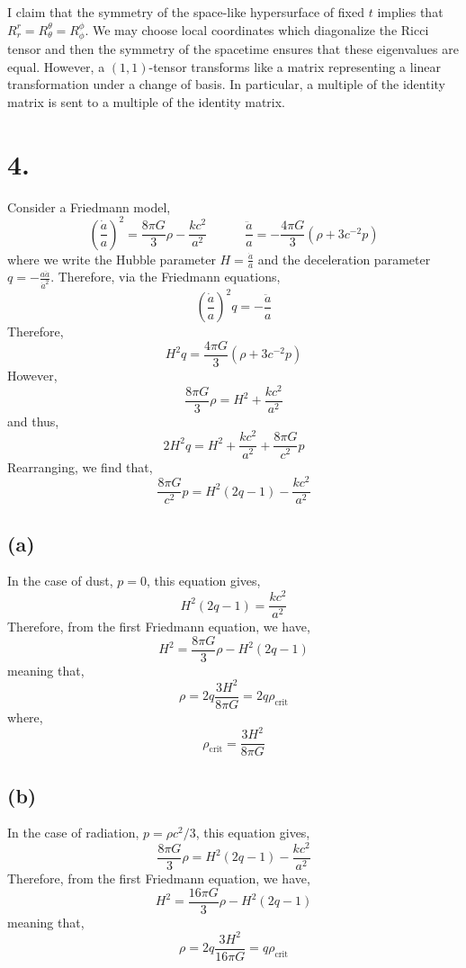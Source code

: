 \documentclass[12pt]{article}
\begin{document}
I claim that the symmetry of the space-like hypersurface of fixed $t$ implies that $R^r_r = R^\theta_\theta = R^\phi_\phi$. We may choose local coordinates which diagonalize the Ricci tensor and then the symmetry of the spacetime ensures that these eigenvalues are equal. However, a $(1,1)$-tensor transforms like a matrix representing a linear transformation under a change of basis. In particular, a multiple of the identity matrix is sent to a multiple of the identity matrix. 

\section*{4.}
Consider a Friedmann model,
\[ \left( \frac{\dot{a}}{a} \right)^2 = \frac{8 \pi G}{3} \rho - \frac{kc^2}{a^2}  \quad \quad \quad \frac{\ddot{a}}{a} = - \frac{4 \pi G}{3} (\rho + 3 c^{-2} p) \]
where we write the Hubble parameter $H = \frac{\dot{a}}{a}$ and the deceleration parameter $q = - \frac{a \ddot{a}}{\dot{a}^2}$. Therefore, via the Friedmann equations,
\[ \left( \frac{\dot{a}}{a} \right)^2 q = - \frac{\ddot{a}}{a} \]
Therefore,
\[ H^2 q = \frac{4 \pi G}{3} (\rho + 3 c^{-2} p) \]
However,
\[ \frac{8 \pi G}{3} \rho = H^2 + \frac{kc^2}{a^2} \]
and thus,
\[ 2 H^2 q = H^2 + \frac{kc^2}{a^2} + \frac{8 \pi G}{c^2} p \]
Rearranging, we find that,
\[ \frac{8 \pi G}{c^2} p = H^2 (2 q - 1) - \frac{kc^2}{a^2} \]


\subsection*{(a)}

In the case of dust, $p = 0$, this equation gives,
\[ H^2 (2q - 1) = \frac{kc^2}{a^2} \]
Therefore, from the first Friedmann equation, we have,
\[ H^2 = \frac{8 \pi G}{3} \rho - H^2 (2 q - 1) \]
meaning that,
\[ \rho = 2q \frac{3 H^2}{8 \pi G} = 2 q \rho_{\text{crit}} \]
where,
\[ \rho_{\text{crit}} = \frac{3 H^2}{8 \pi G} \]

\subsection*{(b)}

In the case of radiation, $p = \rho c^2 / 3$, this equation gives,
\[ \frac{8 \pi G}{3} \rho = H^2 (2q - 1) - \frac{kc^2}{a^2} \]
Therefore, from the first Friedmann equation, we have,
\[ H^2 = \frac{16 \pi G}{3} \rho - H^2 (2 q - 1) \]
meaning that,
\[ \rho = 2q \frac{3 H^2}{16 \pi G} = q \rho_{\text{crit}} \]
\end{document}
